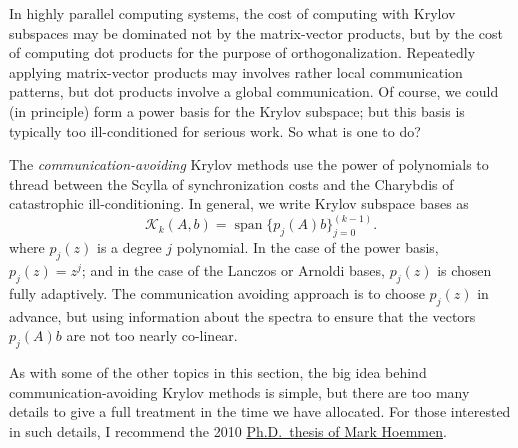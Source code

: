 \documentclass[12pt, leqno]{article} %
\begin{document}
In highly parallel computing systems, the cost of computing with Krylov
subspaces may be dominated not by the matrix-vector products, but by the
cost of computing dot products for the purpose of orthogonalization.
Repeatedly applying matrix-vector products may involves rather local
communication patterns, but dot products involve a global communication.
Of course, we could (in principle) form a power basis for the Krylov
subspace; but this basis is typically too ill-conditioned for serious
work.  So what is one to do?

The {\em communication-avoiding} Krylov methods use the power of
polynomials to thread between the Scylla of synchronization costs and
the Charybdis of catastrophic ill-conditioning.  In general, we write
Krylov subspace bases as
\[
  \mathcal{K}_k(A,b) = \operatorname{span}\{ p_j(A) b \}_{j=0}^{(k-1)}.
\]
where $p_j(z)$ is a degree $j$ polynomial.  In the case of the
power basis, $p_j(z) = z^j$; and in the case of the Lanczos or
Arnoldi bases, $p_j(z)$ is chosen fully adaptively.  The communication
avoiding approach is to choose $p_j(z)$ in advance, but using information
about the spectra to ensure that the vectors $p_j(A) b$ are not too
nearly co-linear.

As with some of the other topics in this section, the big idea behind
communication-avoiding Krylov methods is simple, but there are too many
details to give a full treatment in the time we have allocated.  For
those interested in such details, I recommend the 2010 \href{https://www2.eecs.berkeley.edu/Pubs/TechRpts/2010/EECS-2010-37.pdf}{Ph.D.~thesis of
Mark Hoemmen}.
\end{document}
